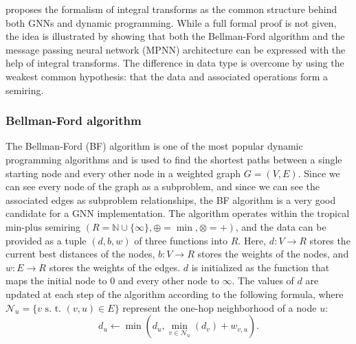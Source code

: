 \documentclass[11pt,a4paper,openright,twoside]{report}
\theoremstyle{plain}
\theoremstyle{definition}
\begin{document}
\cite{dudzik2022graph} proposes the formalism of integral transforms as the common structure behind both GNNs and dynamic programming. While a full formal proof is not given, the idea is illustrated by showing that both the Bellman-Ford algorithm and the message passing neural network (MPNN) architecture can be expressed with the help of integral transforms. The difference in data type is overcome by using the weakest common hypothesis: that the data and associated operations form a semiring.


\subsubsection{Bellman-Ford algorithm}

The Bellman-Ford (BF) algorithm is one of the most popular dynamic programming algorithms and is used to find the shortest paths between a single starting node and every other node in a weighted graph $G = (V, E)$. Since we can see every node of the graph as a subproblem, and since we can see the associated edges as subproblem relationships, the BF algorithm is a very good candidate for a GNN implementation. The algorithm operates within the tropical min-plus semiring $(R = \mathbb{N} \cup \{\infty\}, \oplus = \min, \otimes = +)$, and the data can be provided as a tuple $(d, b, w)$ of three functions into $R$. Here, $d: V \to R$ stores the current best distances of the nodes, $b: V \to R$ stores the weights of the nodes, and $w: E \to R$ stores the weights of the edges. $d$ is initialized as the function that maps the initial node to $0$ and every other node to $\infty$. The values of $d$ are updated at each step of the algorithm according to the following formula, where $\mathcal{N}_u = \{v \text{ s. t. } (v,u) \in E\}$ represent the one-hop neighborhood of a node $u$:
\[d_u \longleftarrow  \min\left(d_u, \min_{v \in \mathcal{N}_u}(d_v) + w_{v,u}\right).\]
\end{document}
